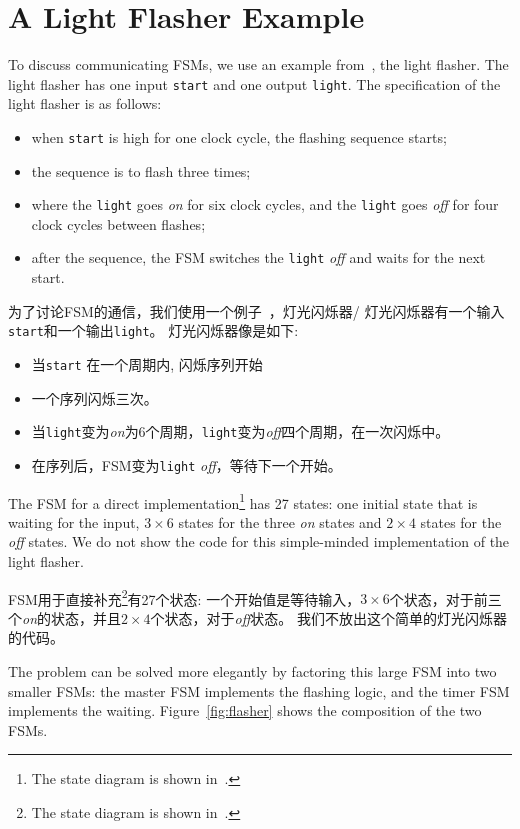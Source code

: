 \documentclass[%
    10pt,
    headinclude, footexclude,
    openright, %
    notitlepage,
    cleardoubleempty,
    headsepline,
    pointlessnumbers,
    bibtotoc, idxtotoc,
    ]{scrbook}
\newcommand{\code}[1]{{\small{\texttt{#1}}}}
\begin{document}
{\section{A Light Flasher Example}

To discuss communicating FSMs, we use an example
from~\cite[Chapter~17]{dally:vhdl:2016}, the light flasher.
The light flasher has one input \code{start} and one output
\code{light}. The specification of the light flasher is as follows:
\begin{itemize}
\item when \code{start} is high for one clock cycle, the flashing
sequence starts;
\item the sequence is to flash three times;
\item where the \code{light} goes \emph{on} for six clock cycles, and the \code{light} goes \emph{off} for four clock cycles between flashes;
\item after the sequence, the FSM switches the \code{light} \emph{off} and waits
for the next start.
\end{itemize}

为了讨论FSM的通信，我们使用一个例子~\cite[Chapter~17]{dally:vhdl:2016}，灯光闪烁器/
灯光闪烁器有一个输入\code{start}和一个输出\code{light}。
灯光闪烁器像是如下:
\begin{itemize}
\item 当\code{start} 在一个周期内, 闪烁序列开始
\item 一个序列闪烁三次。
\item 当\code{light}变为\emph{on}为6个周期，\code{light}变为\emph{off}四个周期，在一次闪烁中。
\item 在序列后，FSM变为\code{light} \emph{off}，等待下一个开始。
\end{itemize}


The FSM for a direct implementation\footnote{The state diagram is shown
in~\cite[p.~376]{dally:vhdl:2016}.} has 27 states:
one initial state that is waiting for the input, $3 \times 6$ states for the three
\emph{on} states and $2 \times 4$ states for the \emph{off} states.
We do not show the code for this simple-minded implementation of the light
flasher.

FSM用于直接补充\footnote{The state diagram is shown
in~\cite[p.~376]{dally:vhdl:2016}.}有27个状态:
一个开始值是等待输入，$3 \times 6$个状态，对于前三个\emph{on}的状态，并且$2 \times 4$个状态，对于\emph{off}状态。
我们不放出这个简单的灯光闪烁器的代码。

The problem can be solved more elegantly by factoring this large FSM into
two smaller FSMs: the master FSM implements the flashing logic, and the timer FSM
implements the waiting. Figure~\ref{fig:flasher} shows the composition of
the two FSMs.

}
\end{document}
